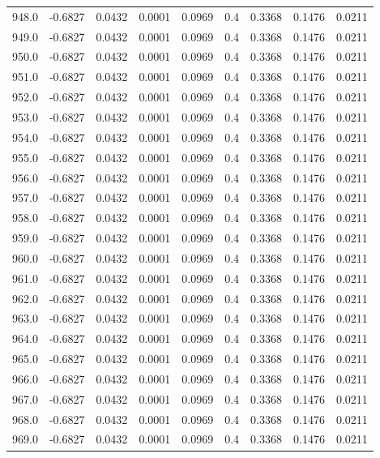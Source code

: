 \begin{longtable}{lrrrrrrrr}
948.0 & -0.6827 & 0.0432 & 0.0001 & 0.0969 & 0.4 & 0.3368 & 0.1476 & 0.0211 \\
949.0 & -0.6827 & 0.0432 & 0.0001 & 0.0969 & 0.4 & 0.3368 & 0.1476 & 0.0211 \\
950.0 & -0.6827 & 0.0432 & 0.0001 & 0.0969 & 0.4 & 0.3368 & 0.1476 & 0.0211 \\
951.0 & -0.6827 & 0.0432 & 0.0001 & 0.0969 & 0.4 & 0.3368 & 0.1476 & 0.0211 \\
952.0 & -0.6827 & 0.0432 & 0.0001 & 0.0969 & 0.4 & 0.3368 & 0.1476 & 0.0211 \\
953.0 & -0.6827 & 0.0432 & 0.0001 & 0.0969 & 0.4 & 0.3368 & 0.1476 & 0.0211 \\
954.0 & -0.6827 & 0.0432 & 0.0001 & 0.0969 & 0.4 & 0.3368 & 0.1476 & 0.0211 \\
955.0 & -0.6827 & 0.0432 & 0.0001 & 0.0969 & 0.4 & 0.3368 & 0.1476 & 0.0211 \\
956.0 & -0.6827 & 0.0432 & 0.0001 & 0.0969 & 0.4 & 0.3368 & 0.1476 & 0.0211 \\
957.0 & -0.6827 & 0.0432 & 0.0001 & 0.0969 & 0.4 & 0.3368 & 0.1476 & 0.0211 \\
958.0 & -0.6827 & 0.0432 & 0.0001 & 0.0969 & 0.4 & 0.3368 & 0.1476 & 0.0211 \\
959.0 & -0.6827 & 0.0432 & 0.0001 & 0.0969 & 0.4 & 0.3368 & 0.1476 & 0.0211 \\
960.0 & -0.6827 & 0.0432 & 0.0001 & 0.0969 & 0.4 & 0.3368 & 0.1476 & 0.0211 \\
961.0 & -0.6827 & 0.0432 & 0.0001 & 0.0969 & 0.4 & 0.3368 & 0.1476 & 0.0211 \\
962.0 & -0.6827 & 0.0432 & 0.0001 & 0.0969 & 0.4 & 0.3368 & 0.1476 & 0.0211 \\
963.0 & -0.6827 & 0.0432 & 0.0001 & 0.0969 & 0.4 & 0.3368 & 0.1476 & 0.0211 \\
964.0 & -0.6827 & 0.0432 & 0.0001 & 0.0969 & 0.4 & 0.3368 & 0.1476 & 0.0211 \\
965.0 & -0.6827 & 0.0432 & 0.0001 & 0.0969 & 0.4 & 0.3368 & 0.1476 & 0.0211 \\
966.0 & -0.6827 & 0.0432 & 0.0001 & 0.0969 & 0.4 & 0.3368 & 0.1476 & 0.0211 \\
967.0 & -0.6827 & 0.0432 & 0.0001 & 0.0969 & 0.4 & 0.3368 & 0.1476 & 0.0211 \\
968.0 & -0.6827 & 0.0432 & 0.0001 & 0.0969 & 0.4 & 0.3368 & 0.1476 & 0.0211 \\
969.0 & -0.6827 & 0.0432 & 0.0001 & 0.0969 & 0.4 & 0.3368 & 0.1476 & 0.0211 \\

\end{longtable}
